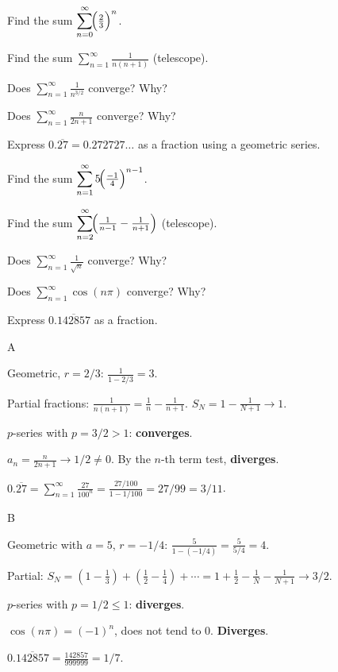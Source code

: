 \documentclass[11pt]{article}
\begin{document}
\begin{problems}
\item Find the sum $\displaystyle \sum_{n=0}^\infty \!\Bigl(\tfrac{2}{3}\Bigr)^n$.
\item Find the sum $\displaystyle \sum_{n=1}^\infty \frac{1}{n(n+1)}$ (telescope).
\item Does $\displaystyle \sum_{n=1}^\infty \frac{1}{n^{3/2}}$ converge? Why?
\item Does $\displaystyle \sum_{n=1}^\infty \frac{n}{2n+1}$ converge? Why?
\item Express $0.\overline{27} = 0.272727\ldots$ as a fraction using a geometric series.
\end{problems}

\vfill
\newpage
{}
\begin{problems}
\item Find the sum $\displaystyle \sum_{n=1}^\infty 5 \!\Bigl(\tfrac{-1}{4}\Bigr)^{n-1}$.
\item Find the sum $\displaystyle \sum_{n=2}^\infty \!\Bigl(\tfrac{1}{n-1} - \tfrac{1}{n+1}\Bigr)$ (telescope).
\item Does $\displaystyle \sum_{n=1}^\infty \tfrac{1}{\sqrt n}$ converge? Why?
\item Does $\displaystyle \sum_{n=1}^\infty \cos(n\pi)$ converge? Why?
\item Express $0.\overline{142857}$ as a fraction.
\end{problems}

\vfill
\newpage
{}

\begin{answers}{A}
\item Geometric, $r = 2/3$: $\tfrac{1}{1 - 2/3} = \boxed{3}$.
\item Partial fractions: $\tfrac{1}{n(n+1)} = \tfrac{1}{n} - \tfrac{1}{n+1}$. $S_N = 1 - \tfrac{1}{N+1} \to \boxed{1}$.
\item $p$-series with $p = 3/2 > 1$: \textbf{converges}.
\item $a_n = \tfrac{n}{2n+1} \to 1/2 \ne 0$. By the $n$-th term test, \textbf{diverges}.
\item $0.\overline{27} = \sum_{n=1}^\infty \tfrac{27}{100^n} = \tfrac{27/100}{1 - 1/100} = \boxed{27/99 = 3/11}$.
\end{answers}

\begin{answers}{B}
\item Geometric with $a = 5$, $r = -1/4$: $\tfrac{5}{1 - (-1/4)} = \tfrac{5}{5/4} = \boxed{4}$.
\item Partial: $S_N = (1 - \tfrac{1}{3}) + (\tfrac{1}{2} - \tfrac{1}{4}) + \cdots = 1 + \tfrac{1}{2} - \tfrac{1}{N} - \tfrac{1}{N+1} \to \boxed{3/2}$.
\item $p$-series with $p = 1/2 \le 1$: \textbf{diverges}.
\item $\cos(n\pi) = (-1)^n$, does not tend to $0$. \textbf{Diverges}.
\item $0.\overline{142857} = \tfrac{142857}{999999} = \boxed{1/7}$.
\end{answers}
\end{document}
